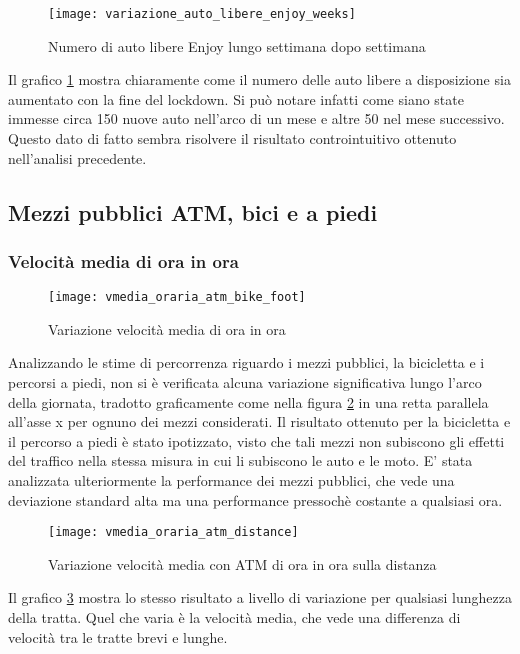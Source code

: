 \begin{figure}[H]
\texttt{[image: variazione\_auto\_libere\_enjoy\_weeks]}
\caption{Numero di auto libere Enjoy lungo settimana dopo settimana}
\label{image:10}
\end{figure}

Il grafico \ref{image:10} mostra chiaramente come il numero delle auto libere a disposizione sia aumentato con la fine del lockdown. Si può notare infatti come siano state immesse circa 150 nuove auto nell'arco di un mese e altre 50 nel mese successivo. Questo dato di fatto sembra risolvere il risultato controintuitivo ottenuto nell'analisi precedente.


\subsection{Mezzi pubblici ATM, bici e a piedi}

\subsubsection{Velocità media di ora in ora}

\begin{figure}[H]
\texttt{[image: vmedia\_oraria\_atm\_bike\_foot]}
\caption{Variazione velocità media di ora in ora}
\label{image:11}
\end{figure}

Analizzando le stime di percorrenza riguardo i mezzi pubblici, la bicicletta e i percorsi a piedi, non si è verificata alcuna variazione significativa lungo l'arco della giornata, tradotto graficamente come nella figura \ref{image:11} in una retta parallela all'asse x per ognuno dei mezzi considerati. Il risultato ottenuto per la bicicletta e il percorso a piedi è stato ipotizzato, visto che tali mezzi non subiscono gli effetti del traffico nella stessa misura in cui li subiscono le auto e le moto. E' stata analizzata ulteriormente la performance dei mezzi pubblici, che vede una deviazione standard alta ma una performance pressochè costante a qualsiasi ora.

\begin{figure}[H]
\texttt{[image: vmedia\_oraria\_atm\_distance]}
\caption{Variazione velocità media con ATM di ora in ora sulla distanza}
\label{image:12}
\end{figure}

Il grafico \ref{image:12} mostra lo stesso risultato a livello di variazione per qualsiasi lunghezza della tratta. Quel che varia è la velocità media, che vede una differenza di velocità tra le tratte brevi e lunghe.

